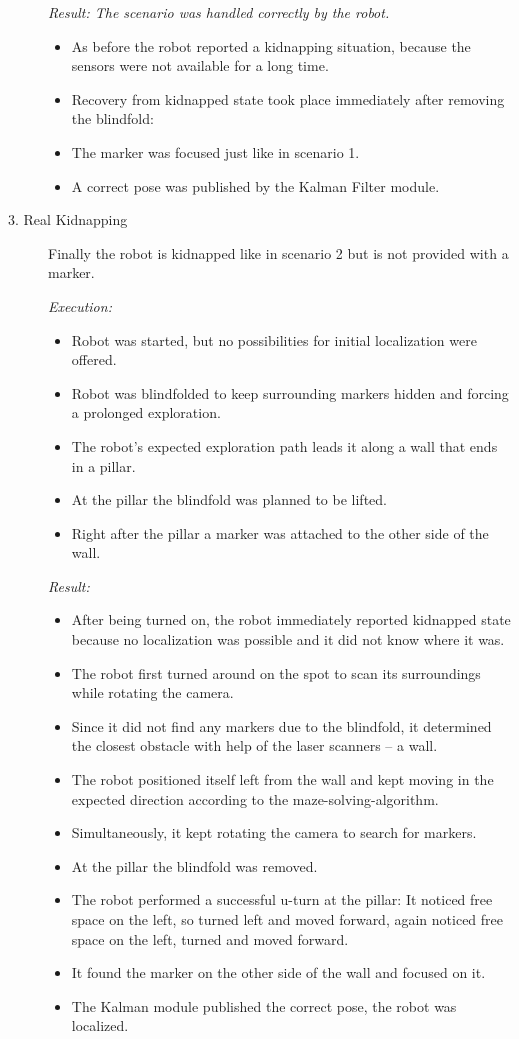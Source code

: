 \begin{description}
\textit{Result: The scenario was handled correctly by the robot.}
\begin{itemize}
\item As before the robot reported a kidnapping situation, because the sensors were not available for a long time.
\item Recovery from kidnapped state took place immediately after removing the blindfold:
\item The marker was focused just like in scenario 1.
\item A correct pose was published by the Kalman Filter module.
\end{itemize}

\item[3. Real Kidnapping] Finally the robot is kidnapped like in scenario 2 but is not provided with a marker.

\textit{Execution:}
\begin{itemize}
\item Robot was started, but no possibilities for initial localization were offered.
\item Robot was blindfolded to keep surrounding markers hidden and forcing a prolonged exploration.
\item The robot's expected exploration path leads it along a wall that ends in a pillar.
\item At the pillar the blindfold was planned to be lifted.
\item Right after the pillar a marker was attached to the other side of the wall.
\end{itemize}

\textit{Result:}
\begin{itemize}
\item After being turned on, the robot immediately reported kidnapped state because no localization was possible and it did not know where it was.
\item The robot first turned around on the spot to scan its surroundings while rotating the camera.
\item Since it did not find any markers due to the blindfold, it determined the closest obstacle with help of the laser scanners -- a wall.
\item The robot positioned itself left from the wall and kept moving in the expected direction according to the maze-solving-algorithm.
\item Simultaneously, it kept rotating the camera to search for markers.
\item At the pillar the blindfold was removed.
\item The robot performed a successful u-turn at the pillar: It noticed free space on the left, so turned left and moved forward, again noticed free space on the left, turned and moved forward.
\item It found the marker on the other side of the wall and focused on it.
\item The Kalman module published the correct pose, the robot was localized.
\end{itemize}


\end{description}
